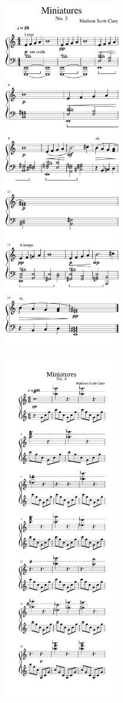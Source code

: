 \begin{rightcolumn*}
\noindent\includegraphics[width=2in]{assets/static/miniatures/3-1.png}

\noindent\includegraphics[width=2in]{assets/static/miniatures/4-1.png}


\end{rightcolumn*}
